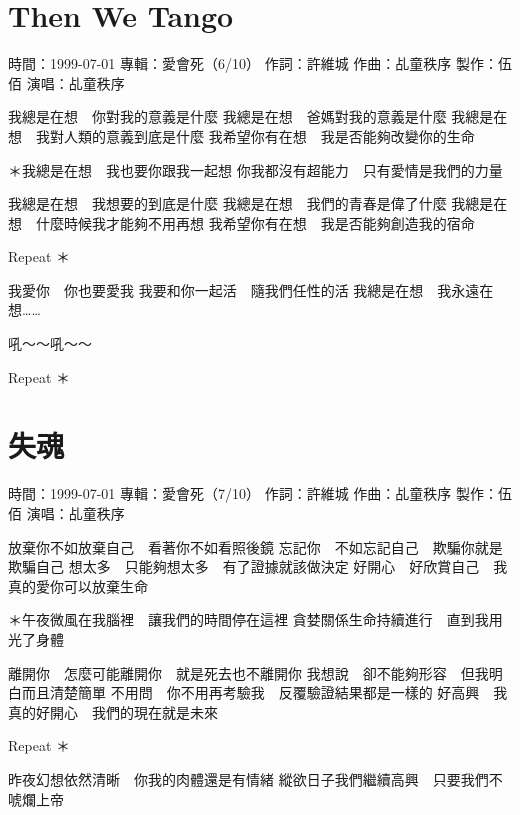 \documentclass[UTF8,a4paper,oneside,twocolumn,12pt]{ctexbook}
\newcommand{\infopair}[2]{\textbullet #1：#2}
\newcommand{\zc}[1][伍佰]{\infopair{作詞}{#1}}
\newcommand{\zq}[1][伍佰]{\infopair{作曲}{#1}}
\newcommand{\zj}[1]{\infopair{專輯}{#1}}
\newcommand{\zz}[1]{\infopair{製作}{#1}}
\newcommand{\sj}[1]{\infopair{時間}{#1}}
\newenvironment{info}{\begin{flushleft}\kaishu
	}
	{\end{flushleft}\normalsize\yahei\par}
\newenvironment{lyric}{
	}
{}
\begin{document}
\section{Then We Tango}
\begin{info}
	\sj{1999-07-01}
	\zj{愛會死（6/10）}
	\zc[許維城]
	\zq[乩童秩序]
	\zz{伍佰}
	\infopair{演唱}{乩童秩序}
\end{info}
\begin{lyric}
	我總是在想　你對我的意義是什麼
	我總是在想　爸媽對我的意義是什麼
	我總是在想　我對人類的意義到底是什麼
	我希望你有在想　我是否能夠改變你的生命

	＊我總是在想　我也要你跟我一起想
	你我都沒有超能力　只有愛情是我們的力量

	我總是在想　我想要的到底是什麼
	我總是在想　我們的青春是偉了什麼
	我總是在想　什麼時候我才能夠不用再想
	我希望你有在想　我是否能夠創造我的宿命

	Repeat ＊

	我愛你　你也要愛我
	我要和你一起活　隨我們任性的活
	我總是在想　我永遠在想……

	吼～～吼～～

	Repeat ＊
\end{lyric}

\section{失魂}
\begin{info}
	\sj{1999-07-01}
	\zj{愛會死（7/10）}
	\zc[許維城]
	\zq[乩童秩序]
	\zz{伍佰}
	\infopair{演唱}{乩童秩序}
\end{info}
\begin{lyric}
	放棄你不如放棄自己　看著你不如看照後鏡
	忘記你　不如忘記自己　欺騙你就是欺騙自己
	想太多　只能夠想太多　有了證據就該做決定
	好開心　好欣賞自己　我真的愛你可以放棄生命

	＊午夜微風在我腦裡　讓我們的時間停在這裡
	貪婪關係生命持續進行　直到我用光了身體

	離開你　怎麼可能離開你　就是死去也不離開你
	我想說　卻不能夠形容　但我明白而且清楚簡單
	不用問　你不用再考驗我　反覆驗證結果都是一樣的
	好高興　我真的好開心　我們的現在就是未來

	Repeat ＊

	昨夜幻想依然清晰　你我的肉體還是有情緒
	縱欲日子我們繼續高興　只要我們不唬爛上帝
\end{lyric}
\end{document}
